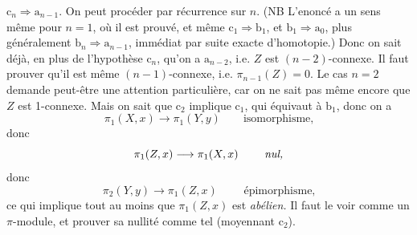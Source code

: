 $\mathrm{c}_n \Longrightarrow \mathrm{a}_{n-1}$. On peut procéder par récurrence sur $n$. (NB L’enoncé a un sens même pour $n=1$, où il est prouvé, et même $\mathrm{c}_1 \Longrightarrow \mathrm{b}_1$, et $\mathrm{b}_1 \Longrightarrow \mathrm{a}_0$, plus généralement $\mathrm{b}_n \Longrightarrow \mathrm{a}_{n-1}$, immédiat par suite exacte d’homotopie.) Donc on sait déjà, en plus de l’hypothèse $\mathrm{c}_n$, qu’on a $\mathrm{a}_{n-2}$, i.e. $Z$ est $(n-2)$-connexe. Il faut prouver qu’il est même $(n-1)$-connexe, i.e. $\pi_{n-1}(Z)=0$. Le cas $n=2$ demande %
peut-être une attention particulière, car on ne sait pas même encore que $Z$ est 1-connexe. Mais on sait que $\mathrm{c}_2$ implique $\mathrm{c}_1$, qui équivaut à $\mathrm{b}_1$, donc on a
\[
\pi_1(X,x) \longrightarrow \pi_1(Y,y) \qquad \text{isomorphisme,}
\]
donc
\[
\pi_1(Z,x) \longrightarrow \pi_1(X,x) \qquad \text{ \textit{nul,}}
\]
donc
\[
\pi_2(Y,y) \longrightarrow \pi_1(Z,x) \qquad \text{ épimorphisme,}
\]
ce qui implique tout au moins que $\pi_1(Z,x)$ est \textit{abélien.} Il faut le voir comme un $\pi$-module, et prouver sa nullité comme tel (moyennant $\mathrm{c}_2$).

